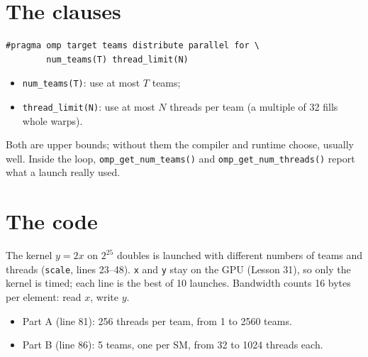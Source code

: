 \documentclass[11pt,a4paper]{article}
\let\origtexttt\texttt
\renewcommand{\texttt}[1]{\textcolor{black!60}{\origtexttt{#1}}}
\begin{document}
\section{The clauses}
\begin{lstlisting}[numbers=none]
#pragma omp target teams distribute parallel for \
        num_teams(T) thread_limit(N)
\end{lstlisting}
\begin{itemize}
  \item \texttt{num\_teams(T)}: use at most $T$ teams;
  \item \texttt{thread\_limit(N)}: use at most $N$ threads per team (a multiple of 32 fills
        whole warps).
\end{itemize}
Both are upper bounds; without them the compiler and runtime choose, usually well. Inside the
loop, \texttt{omp\_get\_num\_teams()} and \texttt{omp\_get\_num\_threads()} report what a launch
really used.

\section{The code}
The kernel $y = 2x$ on $2^{25}$ doubles is launched with different numbers of teams and threads
(\texttt{scale}, lines 23--48). \texttt{x} and \texttt{y} stay on the GPU (Lesson 31), so only
the kernel is timed; each line is the best of 10 launches. Bandwidth counts 16 bytes per
element: read $x$, write $y$.
\begin{itemize}
  \item Part A (line 81): 256 threads per team, from 1 to 2560 teams.
  \item Part B (line 86): 5 teams, one per SM, from 32 to 1024 threads each.
\end{itemize}
\end{document}
